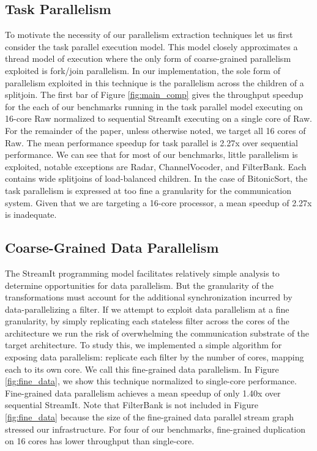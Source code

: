 \subsection{Task Parallelism}
To motivate the necessity of our parallelism extraction techniques let
us first consider the task parallel execution model.  This model
closely approximates a thread model of execution where the only form
of coarse-grained parallelism exploited is fork/join parallelism.  In
our implementation, the sole form of parallelism exploited in this
technique is the parallelism across the children of a splitjoin. The
first bar of Figure \ref{fig:main_comp} gives the throughput speedup
for the each of our benchmarks running in the task parallel model
executing on 16-core Raw normalized to sequential StreamIt executing
on a single core of Raw.  For the remainder of the paper,
unless otherwise noted, we target all 16 cores of Raw.  The 
mean performance speedup for task parallel is 2.27x over sequential
performance. We can see that for most of our benchmarks, little
parallelism is exploited, notable exceptions are Radar,
ChannelVocoder, and FilterBank.  Each contains wide splitjoins of
load-balanced children.  In the case of BitonicSort, the task
parallelism is expressed at too fine a granularity for the
communication system.  Given that we are targeting a 16-core
processor, a mean speedup of 2.27x is inadequate.

\subsection{Coarse-Grained Data Parallelism}

The StreamIt programming model facilitates relatively simple analysis
to determine opportunities for data parallelism.  But the granularity
of the transformations must account for the additional synchronization
incurred by data-parallelizing a filter.  If we attempt to exploit
data parallelism at a fine granularity, by simply replicating each
stateless filter across the cores of the architecture we run the risk
of overwhelming the communication substrate of the target
architecture.  To study this, we implemented a simple algorithm for
exposing data parallelism: replicate each filter by the number of
cores, mapping each to its own core.  We call this fine-grained data
parallelism.  In Figure \ref{fig:fine_data}, we show this technique
normalized to single-core performance.  Fine-grained data parallelism
achieves a mean speedup of only 1.40x over sequential StreamIt.  Note
that FilterBank is not included in Figure \ref{fig:fine_data} because
the size of the fine-grained data parallel stream graph stressed our
infrastructure.  For four of our benchmarks, fine-grained duplication
on 16 cores has lower throughput than single-core.

